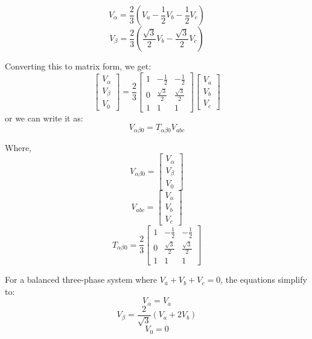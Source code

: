 \begin{equation*}
    V_\alpha = \frac{2}{3}(V_a - \frac{1}{2} V_b - \frac{1}{2} V_c)
\end{equation*}
\begin{equation*}
    V_\beta = \frac{2}{3}(\frac{\sqrt{3}}{2} V_b - \frac{\sqrt{3}}{2} V_c)
\end{equation*}

\noindent
Converting this to matrix form, we get:
\begin{equation*}
    \begin{bmatrix}
        V_\alpha \\
        V_\beta  \\
        V_0
    \end{bmatrix}
    =\frac{2}{3}
    \begin{bmatrix}
        1 & -\frac{1}{2}       & -\frac{1}{2}       \\
        0 & \frac{\sqrt{3}}{2} & \frac{\sqrt{3}}{2} \\
        1 & 1                  & 1
    \end{bmatrix}
    \begin{bmatrix}
        V_a \\
        V_b \\
        V_c
    \end{bmatrix}
\end{equation*}
\noindent
or we can write it as:
\begin{equation*}
    V_{\alpha\beta0} = T_{\alpha\beta0} V_{abc}
\end{equation*}

\noindent
Where,
\begin{equation*}
    V_{\alpha\beta0} = \begin{bmatrix}
        V_\alpha \\
        V_\beta  \\
        V_0
    \end{bmatrix}
\end{equation*}
\begin{equation*}
    V_{abc} = \begin{bmatrix}
        V_a \\
        V_b \\
        V_c
    \end{bmatrix}
\end{equation*}
\begin{equation*}
    T_{\alpha\beta0} = \frac{2}{3}
    \begin{bmatrix}
        1 & -\frac{1}{2}       & -\frac{1}{2}       \\
        0 & \frac{\sqrt{3}}{2} & \frac{\sqrt{3}}{2} \\
        1 & 1                  & 1
    \end{bmatrix}
\end{equation*}

\noindent
For a balanced three-phase system where \( V_a + V_b + V_c = 0 \), the equations simplify to:
\begin{equation*}
    V_\alpha = V_a
\end{equation*}
\begin{equation*}
    V_\beta = \frac{2}{\sqrt{3}} (V_a + 2 V_b)
\end{equation*}
\begin{equation*}
    V_0 = 0
\end{equation*}